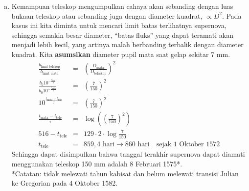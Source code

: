 \documentclass[11pt,fleqn]{exam}
\begin{document}
\begin{questions}
\begin{enumerate}[a.]
    \item Kemampuan teleskop mengumpulkan cahaya akan sebanding dengan luas bukaan teleskop atau sebanding juga dengan diameter kuadrat, $\propto D^2$. Pada kasus ini kita diminta untuk mencari limit batas terlihatnya supernova, sehingga semakin besar diameter, ``batas fluks'' yang dapat teramati akan menjadi lebih kecil, yang artinya malah berbanding terbalik dengan diameter kuadrat. Kita \textbf{asumsikan} diameter pupil mata saat gelap sekitar 7 mm.
    \begin{eqnarray*}
        \frac{b_\text{limit telekop}}{b_\text{limit mata}} &=& \left(\frac{D_\text{mata}}{D_\text{teleskop}}\right)^2\\ 
        \frac{b_0 10^{-\frac{t_\text{tele}}{\tau}}}{b_0 10^{-\frac{t_\text{mata}}{\tau}}} &=& \left( \frac{7}{150} \right)^2\\
        10^{\frac{t_\text{mata} - t_\text{tele}}{\tau}} &=& \left( \frac{7}{150} \right)^2\\
        \frac{t_\text{mata} - t_\text{tele}}{\tau} &=& \log{\left(\left(\frac{7}{150}\right)^2\right)}\\
        516 - t_\text{tele} &=& 129 \cdot 2 \cdot \log{\frac{7}{150}}\\
        t_\text{tele} &=& 859,4 \text{ hari} \rightarrow 860 \text{ hari} \quad \text{sejak 1 Oktober 1572}
    \end{eqnarray*}
    Sehingga dapat disimpulkan bahwa tanggal terakhir supernova dapat diamati menggunakan teleskop 150 mm adalah 8 Februari 1575*. \\
    
    *Catatan: tidak melewati tahun kabisat dan belum melewati transisi Julian ke Gregorian pada 4 Oktober 1582.
\end{enumerate}



\end{questions}
\end{document}
